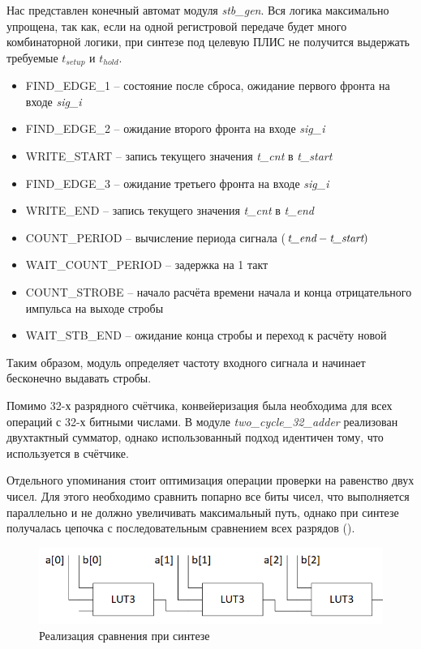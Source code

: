 \FloatBarrier

Нас  представлен конечный автомат модуля \emph{stb\_gen}. Вся логика максимально упрощена, так как, если
на одной регистровой передаче будет много комбинаторной логики, при синтезе под целевую ПЛИС не получится выдержать требуемые $ t_{setup} $ и $ t_{hold} $.

\begin{itemize}[label={}]
	\item FIND\_EDGE\_1 -- состояние после сброса, ожидание первого фронта на входе \emph{sig\_i} 
	\item FIND\_EDGE\_2 -- ожидание второго фронта на входе \emph{sig\_i} 
	\item WRITE\_START -- запись текущего значения \emph{t\_cnt} в \emph{t\_start}
	\item FIND\_EDGE\_3 -- ожидание третьего фронта на входе \emph{sig\_i}
	\item WRITE\_END -- запись текущего значения \emph{t\_cnt} в \emph{t\_end}
	\item COUNT\_PERIOD -- вычисление периода сигнала ($ \emph{t\_end} - \emph{t\_start}) $
	\item WAIT\_COUNT\_PERIOD -- задержка на 1 такт
	\item COUNT\_STROBE -- начало расчёта времени начала и конца отрицательного импульса на выходе стробы
	\item WAIT\_STB\_END -- ожидание конца стробы и переход к расчёту новой\\
\end{itemize}

Таким образом, модуль определяет частоту входного сигнала и начинает бесконечно выдавать стробы.

Помимо 32-х разрядного счётчика, конвейеризация была необходима для всех операций с 32-х битными числами. В модуле \emph{two\_cycle\_32\_adder}
реализован двухтактный сумматор, однако использованный подход идентичен тому, что используется в счётчике.

Отдельного упоминания стоит оптимизация операции проверки на равенство двух чисел. Для этого необходимо сравнить попарно все биты
чисел, что выполняется параллельно и не должно увеличивать максимальный путь, однако при синтезе получалась цепочка с последовательным
сравнением всех разрядов ().\\

\begin{figure}[ht!] 
	\center
	\includegraphics [scale=0.7] {my_folder/images//eq}
	\caption{Реализация сравнения при синтезе} 
	\label{fig:eq}  
\end{figure}

